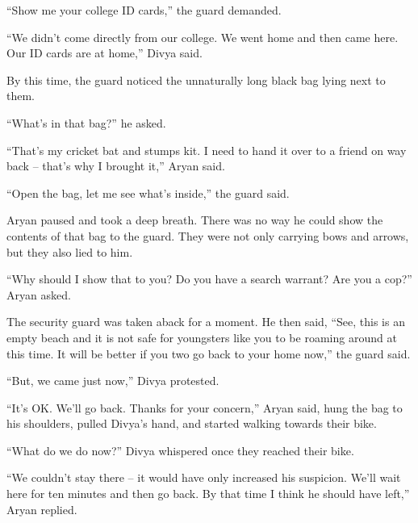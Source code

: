 “Show me your college ID cards,” the guard demanded.

“We didn't come directly from our college. We went home and then came here. Our
ID cards are at home,” Divya said.

By this time, the guard noticed the unnaturally long black bag lying next to
them.

“What's in that bag?” he asked.

“That's my cricket bat and stumps kit. I need to hand it over to a friend on way
back – that's why I brought it,” Aryan said.

“Open the bag, let me see what's inside,” the guard said.

Aryan paused and took a deep breath. There was no way he could show the contents
of that bag to the guard. They were not only carrying bows and arrows, but they
also lied to him.

“Why should I show that to you? Do you have a search warrant? Are you a cop?”
Aryan asked.

The security guard was taken aback for a moment. He then said, “See, this is an
empty beach and it is not safe for youngsters like you to be roaming around at
this time. It will be better if you two go back to your home now,” the guard
said.

“But, we came just now,” Divya protested.

“It's OK. We'll go back. Thanks for your concern,” Aryan said, hung the bag to
his shoulders, pulled Divya's hand, and started walking towards their bike.

“What do we do now?” Divya whispered once they reached their bike.

“We couldn't stay there – it would have only increased his suspicion. We'll wait
here for ten minutes and then go back. By that time I think he should have
left,” Aryan replied.